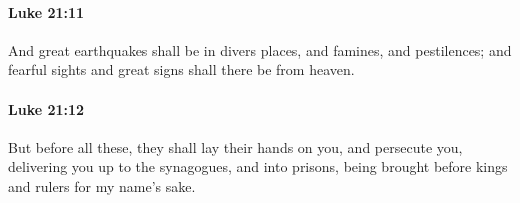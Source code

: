 		\paragraph{Luke 21:11} %
			\label{LUKE-21-11}

			And great earthquakes shall be in divers places, and famines, and pestilences; and fearful sights and great signs shall there be from heaven.

			\begin{framed}
			\scriptsize
				\begin{compactdesc}
					\item[SBLG] 
				\end{compactdesc}
			\end{framed}

		\paragraph{Luke 21:12} %
			\label{LUKE-21-12}

			But before all these, they shall lay their hands on you, and persecute you, delivering you up to the synagogues, and into prisons, being brought before kings and rulers for my name's sake.

